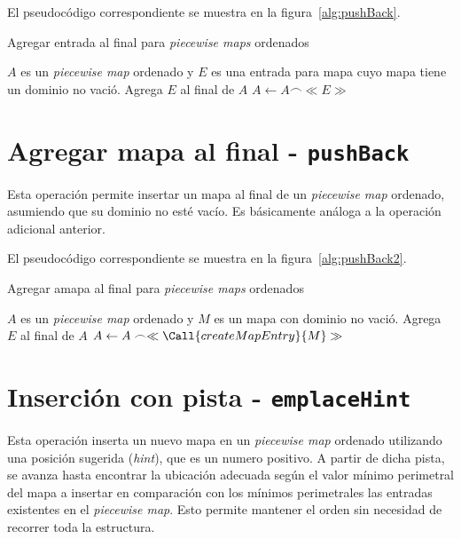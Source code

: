 El pseudocódigo correspondiente se muestra en la figura~\ref{alg:pushBack}.

\begin{algorithm}
\caption{Agregar entrada al final para \textit{piecewise maps} ordenados}
\label{alg:pushBack}
\begin{algorithmic}[1]
\Require $A$ es un \textit{piecewise map} ordenado y $E$ es una entrada para mapa cuyo mapa tiene un dominio no vació.
\Ensure Agrega $E$ al final de $A$
    \State $A \gets A \frown \ll E \gg$
\EndFunction
\end{algorithmic}
\end{algorithm}


\section*{Agregar mapa al final - \texttt{pushBack}}

Esta operación permite insertar un mapa al final de un \textit{piecewise map} ordenado, asumiendo que su dominio no esté vacío. Es básicamente análoga a la operación adicional anterior.

El pseudocódigo correspondiente se muestra en la figura~\ref{alg:pushBack2}.

\begin{algorithm}
\caption{Agregar amapa al final para \textit{piecewise maps} ordenados}
\label{alg:pushBack2}
\begin{algorithmic}[1]
\Require $A$ es un \textit{piecewise map} ordenado y $M$ es un mapa con dominio no vació.
\Ensure Agrega $E$ al final de $A$
    \State $A \gets A \frown \ll \Call{createMapEntry}{M} \gg$
\EndFunction
\end{algorithmic}
\end{algorithm}

\section*{Inserción con pista - \texttt{emplaceHint}}

Esta operación inserta un nuevo mapa en un \textit{piecewise map} ordenado utilizando una posición sugerida (\textit{hint}), que es un numero positivo. A partir de dicha pista, se avanza hasta encontrar la ubicación adecuada según el valor mínimo perimetral del mapa a insertar en comparación con los mínimos perimetrales las entradas existentes en el \textit{piecewise map}. Esto permite mantener el orden sin necesidad de recorrer toda la estructura.

